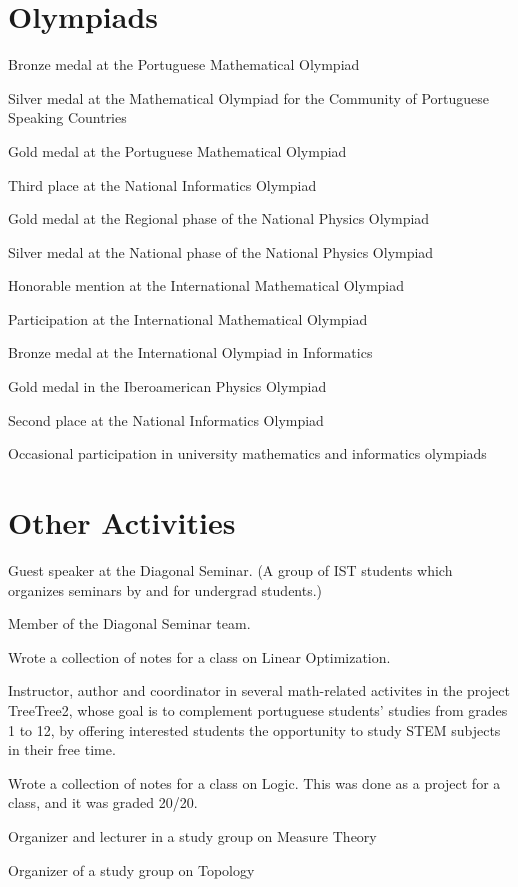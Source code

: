 \documentclass[11pt]{article} %
\begin{document}
\section*{Olympiads}

 \entry Bronze medal at the Portuguese Mathematical Olympiad
\smallskip

\entry Silver medal at the Mathematical Olympiad for the Community of Portuguese Speaking Countries
\smallskip

 \entry Gold medal at the Portuguese Mathematical Olympiad
\smallskip

\entry Third place at the National Informatics Olympiad
\smallskip

\entry Gold medal at the Regional phase of the National Physics Olympiad
\smallskip

\entry Silver medal at the National phase of the National Physics Olympiad
\smallskip

\entry Honorable mention at the International Mathematical Olympiad
\smallskip

 \entry Participation at the International Mathematical Olympiad
\smallskip

\entry Bronze medal at the International Olympiad in Informatics
\smallskip

\entry Gold medal in the Iberoamerican Physics Olympiad
\smallskip

\entry Second place at the National Informatics Olympiad
\smallskip

 \entry Occasional participation in university mathematics and informatics olympiads

\section*{Other Activities}

 \entry Guest speaker at the Diagonal Seminar. (A group of IST students which organizes seminars by and for undergrad students.)

 \entry Member of the Diagonal Seminar team.

 \entry Wrote a collection of notes for a class on Linear Optimization.

 \entry Instructor, author and coordinator in several math-related activites in the project TreeTree2, whose goal is to complement portuguese students' studies from grades 1 to 12, by offering interested students the opportunity to study STEM subjects in their free time.

\pagebreak

 \entry Wrote a collection of notes for a class on Logic. This was done as a project for a class, and it was graded 20/20.

 \entry Organizer and lecturer in a study group on Measure Theory

 \entry Organizer of a study group on Topology





\end{document}
